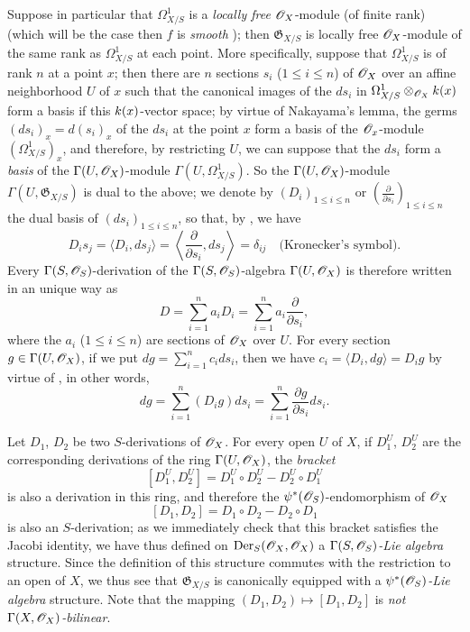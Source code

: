 \begin{env}[16.5.8]
\label{IV.16.5.8}
Suppose in particular that $\Omega_{X/S}^1$ is a \emph{locally free} $\mathscr{O}_X$-module (of finite rank) (which will be the case then $f$ is \emph{smooth} );
then $\mathfrak{G}_{X/S}$ is locally free $\mathscr{O}_X$-module of the same rank as $\Omega_{X/S}^1$ at each point.
More specifically, suppose that $\Omega_{X/S}^1$ is of rank $n$ at a point $x$;
then there are $n$ sections $s_i$ ($1 \leq i \leq n$) of $\mathscr{O}_X$ over an affine neighborhood $U$ of $x$ such that the canonical images of the $ds_i$ in $\Omega_{X/S}^1 \otimes_{\mathscr{O}_X} k(x)$ form a basis if this $k(x)$-vector space;
by virtue of Nakayama's lemma, the germs $(ds_i)_x = d(s_i)_x$ of the $ds_i$ at the point $x$ form a basis of the $\mathscr{O}_x$-module $(\Omega_{X/S}^1)_x$, and therefore, by restricting $U$, we can suppose that the $ds_i$ form a \emph{basis} of the $\Gamma(U, \mathscr{O}_X)$-module $\Gamma(U, \Omega_{X/S}^1)$.
So the $\Gamma(U, \mathscr{O}_X)$-module $\Gamma(U, \mathfrak{G}_{X/S})$ is dual to the above;
we denote by $(D_i)_{1 \leq i \leq n}$ or $\left(\frac{\partial}{\partial s_i}\right)_{1 \leq i \leq n}$ the dual basis of $(ds_i)_{1 \leq i \leq n}$, so that, by , we have
\[
\label{IV.16.5.8.1}
  D_i s_j = \langle D_i, ds_j \rangle = \left\langle \frac{\partial}{\partial s_i}, ds_j \right\rangle = \delta_{ij} \quad \text{(Kronecker's symbol)}.
  \tag{16.5.8.1}
\]
Every $\Gamma(S, \mathscr{O}_S)$-derivation of the $\Gamma(S, \mathscr{O}_S)$-algebra $\Gamma(U, \mathscr{O}_X)$ is therefore written in an unique way as 
\[
  D = \sum_{i = 1}^n a_i D_i = \sum_{i = 1}^n a_i \frac{\partial}{\partial s_i},
\] 
where the $a_i$ ($1 \leq i \leq n$) are sections of $\mathscr{O}_X$ over $U$.
For every section $g \in \Gamma(U, \mathscr{O}_X)$, if we put $dg = \sum_{i = 1}^n c_i ds_i$, then we have $c_i = \langle D_i, dg \rangle = D_i g$ by virtue of , in other words,
\[
\label{IV.16.5.8.2}
  dg = \sum_{i = 1}^n (D_i g) ds_i = \sum_{i = 1}^n \frac{\partial g}{\partial s_i} ds_i.
  \tag{16.5.8.2}
\]
\end{env}

\begin{env}[16.5.9]
\label{IV.16.5.9}
Let $D_1$, $D_2$ be two $S$-derivations of $\mathscr{O}_X$. 
For every open $U$ of $X$, if $D_1^U$, $D_2^U$ are the corresponding derivations of the ring $\Gamma(U, \mathscr{O}_X)$, the \emph{bracket}
\[
  [D_1^U, D_2^U] = D_1^U \circ D_2^U - D_2^U \circ D_1^U
\]
is also a derivation in this ring, and therefore the $\psi^*(\mathscr{O}_S)$-endomorphism of $\mathscr{O}_X$
\[
\label{IV.16.5.9.1}
  [D_1, D_2] = D_1 \circ D_2 - D_2 \circ D_1
  \tag{16.5.9.1}
\]
is also an $S$-derivation;
as we immediately check that this bracket satisfies the Jacobi identity, we have thus defined on $\operatorname{Der}_S(\mathscr{O}_X, \mathscr{O}_X)$ a \emph{$\Gamma(S, \mathscr{O}_S)$-Lie algebra} structure.
Since the definition of this structure commutes with the restriction to an open of $X$, we thus see that $\mathfrak{G}_{X/S}$ is canonically equipped with a \emph{ $\psi^*(\mathscr{O}_S)$-Lie algebra} structure.
Note that the mapping $(D_1, D_2) \mapsto [D_1, D_2]$ is \emph{not $\Gamma(X, \mathscr{O}_X)$-bilinear}.
\end{env} 

